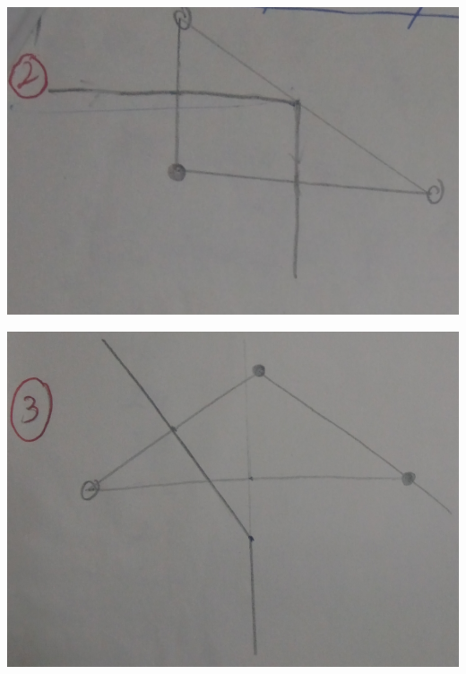 \documentclass[12pt]{article}
\begin{document}
	\begin{center}
		\includegraphics{screenshot011}
	\end{center}
	
	\begin{center}
		\includegraphics[width=0.7\linewidth]{screenshot012}
	\end{center}
	
\end{document}
